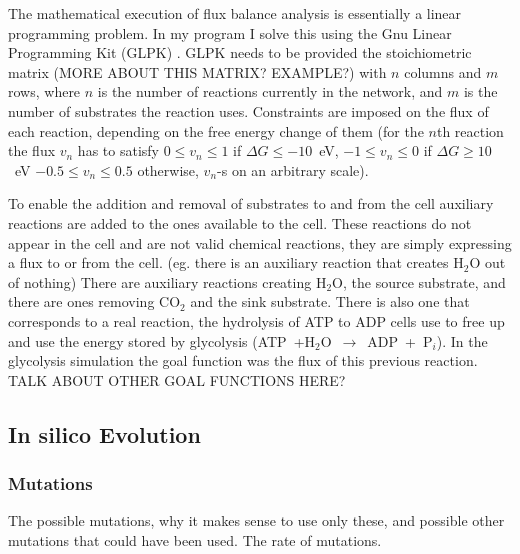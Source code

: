 \documentclass[10pt,a4paper]{article}
\begin{document}
	The mathematical execution of flux balance analysis is essentially a linear programming problem. In my program I solve this using the Gnu Linear Programming Kit (GLPK) \cite{glpk}. GLPK needs to be provided the stoichiometric matrix (MORE ABOUT THIS MATRIX? EXAMPLE?) with $n$ columns and $m$ rows, where $n$ is the number of reactions currently in the network, and $m$ is the number of substrates the reaction uses. Constraints are imposed on the flux of each reaction, depending on the free energy change of them (for the $n$th reaction the flux $v_n$ has to satisfy $0\leq v_n \leq 1 $ if $\Delta G \leq -10$~eV, $-1\leq v_n \leq 0 $ if $\Delta G \geq 10$~eV $-0.5\leq v_n \leq 0.5$ otherwise, $v_n$-s on an arbitrary scale). 
	
	To enable the addition and removal of substrates to and from the cell auxiliary reactions are added to the ones available to the cell. These reactions do not appear in the cell and are not valid chemical reactions, they are simply expressing a flux to or from the cell. (eg. there is an auxiliary reaction that creates H$_2$O out of nothing) There are auxiliary reactions creating H$_2$O, the source substrate, and there are ones removing CO$_2$ and the sink substrate. There is also one that corresponds to a real reaction, the hydrolysis of ATP to ADP cells use to free up and use the energy stored by glycolysis (ATP~+H$_2$O~$\rightarrow$~ADP~+~P$_i$). In the glycolysis simulation the goal function was the flux of this previous reaction. 
	TALK ABOUT OTHER GOAL FUNCTIONS HERE?

\subsection{In silico Evolution}
\label{sub:Implementing evolution}
\subsubsection{Mutations}
\label{ssub:Mutations}
The possible mutations, why it makes sense to use only these, and possible other mutations that could have been used. The rate of mutations. 
\end{document}

